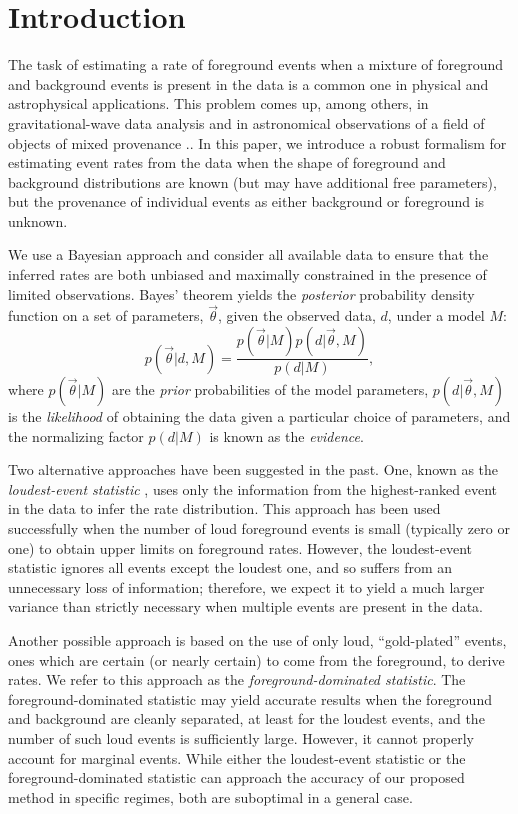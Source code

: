 \documentclass[aps,prd]{revtex4-1}
\begin{document}
\section{Introduction}

The task of estimating a rate of foreground events when a mixture of foreground and background events is present in the data is a common one in physical and astrophysical applications.  This problem comes up, among others, in gravitational-wave data analysis \cite[e.g.,][]{s5-highmass,s6-lowmass} and in astronomical observations of a field of objects of mixed provenance \cite[GC cluster paper]{}..  In this paper, we introduce a robust formalism for estimating event rates from the data when the shape of foreground and background distributions are known (but may have additional free parameters), but the provenance of individual events as either background or foreground is unknown.  

We use a Bayesian approach and consider all available data to ensure that the inferred rates are both unbiased and maximally constrained in the presence of limited observations.  Bayes' theorem yields the \emph{posterior} probability density function on a set of parameters, $\vec{\theta}$, given the observed data, $d$, under a model $M$:
\begin{equation}
p(\vec{\theta} | d, M) = \frac{p(\vec{\theta}|M) p(d|\vec{\theta},M)}{p(d|M)},
\end{equation}
where $p(\vec{\theta}|M)$ are the \emph{prior} probabilities of the model parameters, $p(d|\vec{\theta},M)$ is the \emph{likelihood} of obtaining the data given a particular choice of parameters, and the normalizing factor $p(d|M)$ is known as the \emph{evidence}.

Two alternative approaches have been suggested in the past.  One, known as the \emph{loudest-event statistic} \cite{Biswas2009}, uses only the information from the highest-ranked event in the data to infer the rate distribution.  This approach has been used successfully \cite{s5-highmass,s6-lowmass} when the number of loud foreground events is small (typically zero or one) to obtain upper limits on foreground rates.  However, the loudest-event statistic ignores all events except the loudest one, and so suffers from an unnecessary loss of information; therefore, we expect it to yield a much larger variance than strictly necessary when multiple events are present in the data.  

Another possible approach is based on the use of only loud, ``gold-plated'' events, ones which are certain (or nearly certain) to come from the foreground, to derive rates.  We refer to this approach as the \emph{foreground-dominated statistic}.  The foreground-dominated statistic may yield accurate results when the foreground and background are cleanly separated, at least for the loudest events, and the number of such loud events is sufficiently large.  However, it cannot properly account for marginal events.  While either the loudest-event statistic or the foreground-dominated statistic can approach the accuracy of our proposed method in specific regimes, both are suboptimal in a general case.
\end{document}

